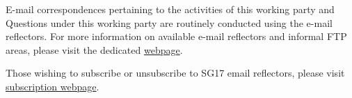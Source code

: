 E-mail correspondences pertaining to the activities of this working party and Questions under this working party are routinely conducted using the e-mail reflectors. For more information on available e-mail reflectors and informal FTP areas, please visit the dedicated \href{https://www.itu.inthttps://www.itu.int/en/ITU-T/studygroups/2025-2028/17/Pages/ifa-structure.aspx}{webpage}.

Those wishing to subscribe or unsubscribe to SG17 email reflectors, please visit \href{https://www.itu.int/net4/iwm?p0=0&p11=ITU&p12=ITU-SEP-ITU-T-SEP-SP%2017-SEP-Study%20Group%2017&p21=ITU&p22=ITU}{subscription webpage}.
